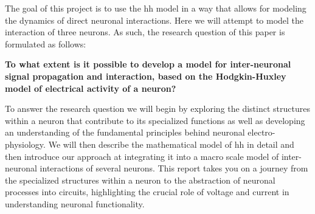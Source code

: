 \documentclass[class={myRUCProject}, crop=false]{standalone}
\begin{document}
The goal of this project is to use the \gls{hh} model in a way that allows for modeling the dynamics of direct neuronal interactions. 
Here we will attempt to model the interaction of three neurons. 
As such, the research question of this paper is formulated as follows: 
\begin{center}
    \textbf{To what extent is it possible to develop a model for inter-neuronal signal propagation and interaction, based on the Hodgkin-Huxley model of electrical activity of a neuron?}
\end{center}






To answer the research question we will begin by exploring the distinct structures within a neuron that contribute to its specialized functions as well as developing an understanding of the fundamental principles behind neuronal electro-physiology. 
We will then describe the mathematical model of \gls{hh} in detail and then introduce our approach at integrating it into a macro scale model of inter-neuronal interactions of several neurons.
This report takes you on a journey from the specialized structures within a neuron to the abstraction of neuronal processes into circuits, highlighting the crucial role of voltage and current in understanding neuronal functionality.
\end{document}
